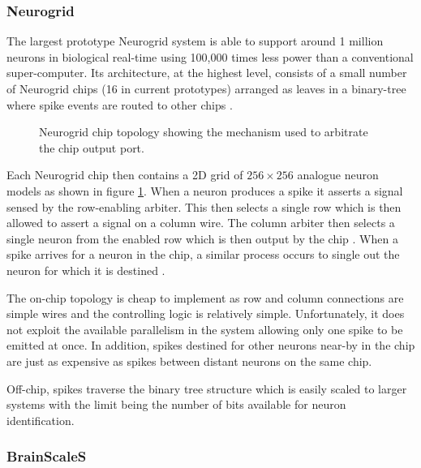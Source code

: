 			\subsubsection{Neurogrid}
				
				The largest prototype Neurogrid system is able to support around 1
				million neurons in biological real-time using 100,000 times less power
				than a conventional super-computer. Its architecture, at the highest
				level, consists of a small number of Neurogrid chips  (16 in current
				prototypes) arranged as leaves in a binary-tree where spike events are
				routed to other chips \cite{choudhary12}.
				
				\begin{figure}
					\center
					
					\caption[Neurogrid chip topology.]{Neurogrid chip topology showing the
					mechanism used to arbitrate the chip output port.}
					\label{fig:neurogrid-chip}
				\end{figure}
				
				Each Neurogrid chip then contains a 2D grid of $256\times256$ analogue
				neuron models as shown in figure \ref{fig:neurogrid-chip}. When a neuron
				produces a spike it asserts a signal sensed by the row-enabling arbiter.
				This then selects a single row which is then allowed to assert a signal
				on a column wire. The column arbiter then selects a single neuron from
				the enabled row which is then output by the chip \cite{boahen04}. When a
				spike arrives for a neuron in the chip, a similar process occurs to
				single out the neuron for which it is destined \cite{boahen04receiver}.
				
				The on-chip topology is cheap to implement as row and column connections
				are simple wires and the controlling logic is relatively simple.
				Unfortunately, it does not exploit the available parallelism in the
				system allowing only one spike to be emitted at once. In addition,
				spikes destined for other neurons near-by in the chip are just as
				expensive as spikes between distant neurons on the same chip.
				
				Off-chip, spikes traverse the binary tree structure which is easily
				scaled to larger systems with the limit being the number of bits
				available for neuron identification.
			
			\subsubsection{BrainScaleS}
				
